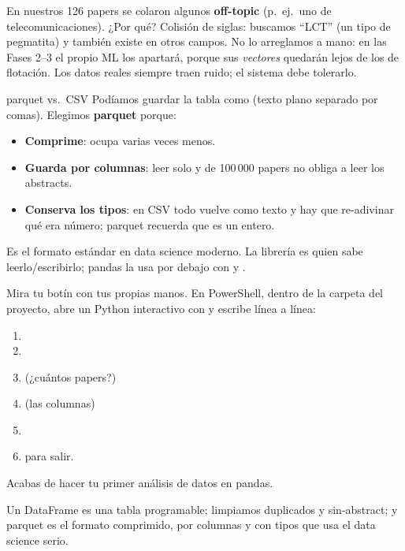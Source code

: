 \documentclass[11pt,a4paper]{article}
\begin{document}
\begin{ojo}
En nuestros 126 papers se colaron algunos \textbf{off-topic} (p.\ ej.\ uno de
telecomunicaciones). ¿Por qué? Colisión de siglas: buscamos ``LCT'' (un tipo de pegmatita)
y también existe en otros campos. No lo arreglamos a mano: en las Fases 2--3 el propio ML
los apartará, porque sus \emph{vectores} quedarán lejos de los de flotación. Los datos
reales siempre traen ruido; el sistema debe tolerarlo.
\end{ojo}

\begin{concepto}{parquet vs.\ CSV}
Podíamos guardar la tabla como  (texto plano separado por comas). Elegimos
\textbf{parquet} porque:
\begin{itemize}
  \item \textbf{Comprime}: ocupa varias veces menos.
  \item \textbf{Guarda por columnas}: leer solo  y  de
        100\,000 papers no obliga a leer los abstracts.
  \item \textbf{Conserva los tipos}: en CSV todo vuelve como texto y hay que re-adivinar
        qué era número; parquet recuerda que  es un entero.
\end{itemize}
Es el formato estándar en data science moderno. La librería  es quien
sabe leerlo/escribirlo; pandas la usa por debajo con
 y .
\end{concepto}

\begin{practica}
Mira tu botín con tus propias manos. En PowerShell, dentro de la carpeta del proyecto,
abre un Python interactivo con 
y escribe línea a línea:
\begin{enumerate}
  \item {}
  \item {}
  \item {} \quad (¿cuántos papers?)
  \item {} \quad (las columnas)
  \item {}
  \item {} para salir.
\end{enumerate}
Acabas de hacer tu primer análisis de datos en pandas.
\end{practica}

\begin{resumen}
Un DataFrame es una tabla programable; limpiamos duplicados y sin-abstract; y parquet es
el formato comprimido, por columnas y con tipos que usa el data science serio.
\end{resumen}
\end{document}
